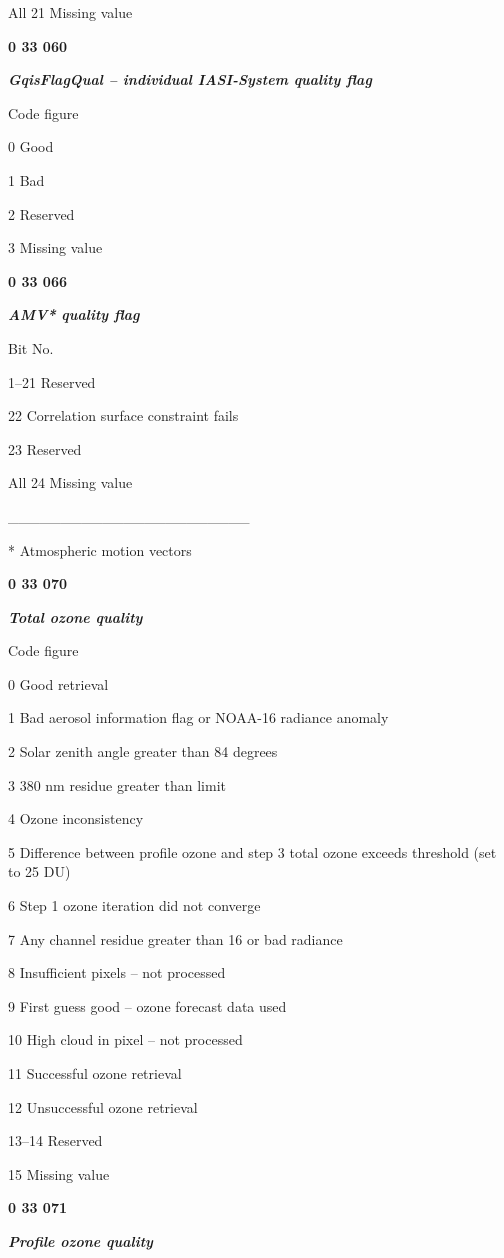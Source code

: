 All 21 Missing value

\textbf{0 33 060}

\emph{\textbf{GqisFlagQual -- individual IASI-System quality flag}}

Code figure

0 Good

1 Bad

2 Reserved

3 Missing value

\textbf{0 33 066}

\emph{\textbf{AMV* quality flag}}

Bit No.

1--21 Reserved

22 Correlation surface constraint fails

23 Reserved

All 24 Missing value

\_\_\_\_\_\_\_\_\_\_\_\_\_\_\_\_\_\_\_\_\_\_\_

* Atmospheric motion vectors

\textbf{0 33 070}

\emph{\textbf{Total ozone quality}}

Code figure

0 Good retrieval

1 Bad aerosol information flag or NOAA-16 radiance anomaly

2 Solar zenith angle greater than 84 degrees

3 380 nm residue greater than limit

4 Ozone inconsistency

5 Difference between profile ozone and step 3 total ozone exceeds threshold (set to 25 DU)

6 Step 1 ozone iteration did not converge

7 Any channel residue greater than 16 or bad radiance

8 Insufficient pixels -- not processed

9 First guess good -- ozone forecast data used

10 High cloud in pixel -- not processed

11 Successful ozone retrieval

12 Unsuccessful ozone retrieval

13--14 Reserved

15 Missing value

\textbf{0 33 071}

\emph{\textbf{Profile ozone quality}}

